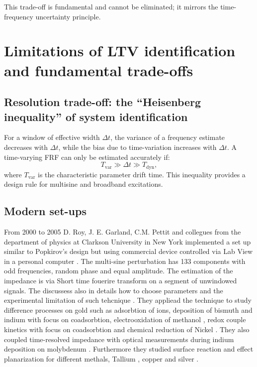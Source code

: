This trade-off is fundamental and cannot be eliminated; it mirrors the time-frequency uncertainty principle.

\section{Limitations of LTV identification and fundamental trade-offs}

\subsection{Resolution trade-off: the “Heisenberg inequality” of system identification}

For a window of effective width $\Delta t$, the variance of a frequency estimate decreases with $\Delta t$, while the bias due to time-variation increases with $\Delta t$. A time-varying FRF can only be estimated accurately if:
\[
T_{\mathrm{var}} \gg \Delta t \gg T_{\mathrm{dyn}},
\]
where $T_{\mathrm{var}}$ is the characteristic parameter drift time. This inequality provides a design rule for multisine and broadband excitations.


\subsection{Modern set-ups}

From 2000 to 2005 D. Roy, J. E. Garland, C.M. Pettit and collegues from the department of physics at Clarkson University in New York implemented a set up  similar to Popkirov's design but using commercial device controlled via Lab View in a personal computer \cite{waltersWeakAdsorptionAnions2001a}. The multi-sine perturbation has 133 components with odd frequencies, random phase and equal amplitude. The estimation of the impedance is via Short time fouerire transform on a segment of unwindowed signals. The discussess also in details how to choose parameters and the experimental limitation of such tehcnique \cite{garlandAnalysisExperimentalConstraints2004}. They appliead the technique to study difference processes on gold such as adsorbtion of ions, deposition of bismuth \cite{garlandKineticAnalysisElectrosorption2002a} and indium with focus on coadsorbtion, electrooxidation of methanol \cite{assiongbonElectrooxidationMethanolGold2005}, redox couple kinetics with focus on coadsorbtion \cite{emeryTimeResolvedImpedance2005} and chemical reduction of Nickel \cite{shiElectrocatalysisHypophosphiteNickel2014}. 
They also coupled time-resolved impedance with optical measurements during indium deposition on molybdenum \cite{pettitElectrodepositionIndiumMolybdenum2002}. Furthermore they studied surface reaction and effect planarization for different methals, Tallium \cite{assiongbonChemicalRolesPeroxidebased2004} \cite{gorantlaChemicalEffectsChemical2005} \cite{pettitRoleIodateIons2005}, copper \cite{luRelativeRoles22004} \cite{pettitTimeResolvedStudy2004} \cite{gorantlaCitricAcidComplexing2005} and silver \cite{assiongbonElectrooxidationMethanolGold2005} .

